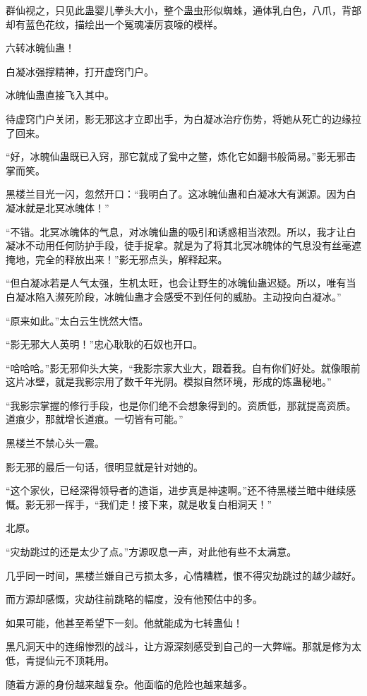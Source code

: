 \begin{this_body}
群仙视之，只见此蛊婴儿拳头大小，整个蛊虫形似蜘蛛，通体乳白色，八爪，背部却有蓝色花纹，描绘出一个冤魂凄厉哀嚎的模样。

六转冰魄仙蛊！

白凝冰强撑精神，打开虚窍门户。

冰魄仙蛊直接飞入其中。

待虚窍门户关闭，影无邪这才立即出手，为白凝冰治疗伤势，将她从死亡的边缘拉了回来。

“好，冰魄仙蛊既已入窍，那它就成了瓮中之鳖，炼化它如翻书般简易。”影无邪击掌而笑。

黑楼兰目光一闪，忽然开口：“我明白了。这冰魄仙蛊和白凝冰大有渊源。因为白凝冰就是北冥冰魄体！”

“不错。北冥冰魄体的气息，对冰魄仙蛊的吸引和诱惑相当浓烈。所以，我才让白凝冰不动用任何防护手段，徒手捉拿。就是为了将其北冥冰魄体的气息没有丝毫遮掩地，完全的释放出来！”影无邪点头，解释起来。

“但白凝冰若是人气太强，生机太旺，也会让野生的冰魄仙蛊迟疑。所以，唯有当白凝冰陷入濒死阶段，冰魄仙蛊才会感受不到任何的威胁。主动投向白凝冰。”

“原来如此。”太白云生恍然大悟。

“影无邪大人英明！”忠心耿耿的石奴也开口。

“哈哈哈。”影无邪仰头大笑，“我影宗家大业大，跟着我。自有你们好处。就像眼前这片冰壁，就是我影宗用了数千年光阴。模拟自然环境，形成的炼蛊秘地。”

“我影宗掌握的修行手段，也是你们绝不会想象得到的。资质低，那就提高资质。道痕少，那就增长道痕。一切皆有可能。”

黑楼兰不禁心头一震。

影无邪的最后一句话，很明显就是针对她的。

“这个家伙，已经深得领导者的造诣，进步真是神速啊。”还不待黑楼兰暗中继续感慨。影无邪一挥手，“我们走！接下来，就是收复白相洞天！”

北原。

“灾劫跳过的还是太少了点。”方源叹息一声，对此他有些不太满意。

几乎同一时间，黑楼兰嫌自己亏损太多，心情糟糕，恨不得灾劫跳过的越少越好。

而方源却感慨，灾劫往前跳略的幅度，没有他预估中的多。

如果可能，他甚至希望下一刻。他就能成为七转蛊仙！

黑凡洞天中的连绵惨烈的战斗，让方源深刻感受到自己的一大弊端。那就是修为太低，青提仙元不顶耗用。

随着方源的身份越来越复杂。他面临的危险也越来越多。


\end{this_body}
